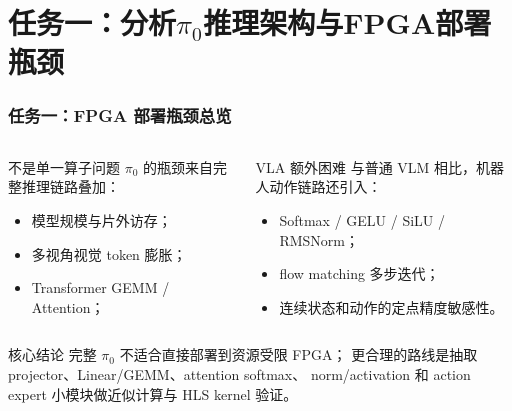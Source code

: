 \documentclass[10pt, aspectratio=169]{beamer}
\begin{document}
\section{任务一：分析\texorpdfstring{$\pi_0$}{pi0}推理架构与FPGA部署瓶颈}

\begin{frame}
  \frametitle{任务一：FPGA 部署瓶颈总览}
  \small
  \begin{columns}[T,onlytextwidth]
    \begin{block}{不是单一算子问题}
      $\pi_0$ 的瓶颈来自完整推理链路叠加：
      \begin{itemize}
        \item 模型规模与片外访存；
        \item 多视角视觉 token 膨胀；
        \item Transformer GEMM / Attention；
      \end{itemize}
    \end{block}

    \begin{block}{VLA 额外困难}
      与普通 VLM 相比，机器人动作链路还引入：
      \begin{itemize}
        \item Softmax / GELU / SiLU / RMSNorm；
        \item flow matching 多步迭代；
        \item 连续状态和动作的定点精度敏感性。
      \end{itemize}
    \end{block}
  \end{columns}

  \vspace{4pt}
  \begin{alertblock}{核心结论}
    完整 $\pi_0$ 不适合直接部署到资源受限 FPGA；
    更合理的路线是抽取 projector、Linear/GEMM、attention softmax、
    norm/activation 和 action expert 小模块做近似计算与 HLS kernel 验证。
  \end{alertblock}
\end{frame}
\end{document}
